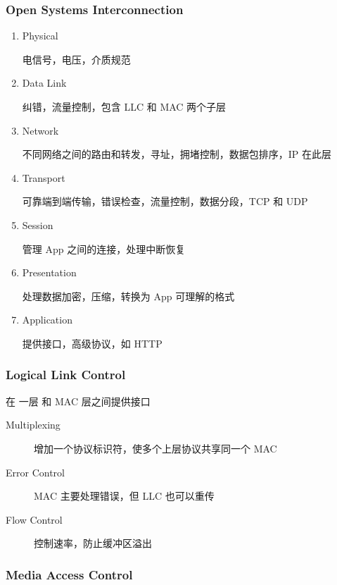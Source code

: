 \documentclass[11pt,journal,compsoc]{IEEEtran}
\begin{document}
\subsubsection{Open Systems Interconnection}

\begin{enumerate}
    \item Physical

    电信号，电压，介质规范
    
    \item Data Link

    纠错，流量控制，包含 LLC 和 MAC 两个子层

    \item Network

    不同网络之间的路由和转发，寻址，拥堵控制，数据包排序，IP 在此层

    \item Transport

    可靠端到端传输，错误检查，流量控制，数据分段，TCP 和 UDP

    \item Session

    管理 App 之间的连接，处理中断恢复

    \item Presentation

    处理数据加密，压缩，转换为 App 可理解的格式

    \item Application

    提供接口，高级协议，如 HTTP
\end{enumerate}


\subsubsection{Logical Link Control}

在 一层 和 MAC 层之间提供接口

\begin{description}
    \item[Multiplexing] 增加一个协议标识符，使多个上层协议共享同一个 MAC

    \item[Error Control] MAC 主要处理错误，但 LLC 也可以重传

    \item[Flow Control] 控制速率，防止缓冲区溢出
\end{description}


\subsubsection{Media Access Control}
\end{document}
